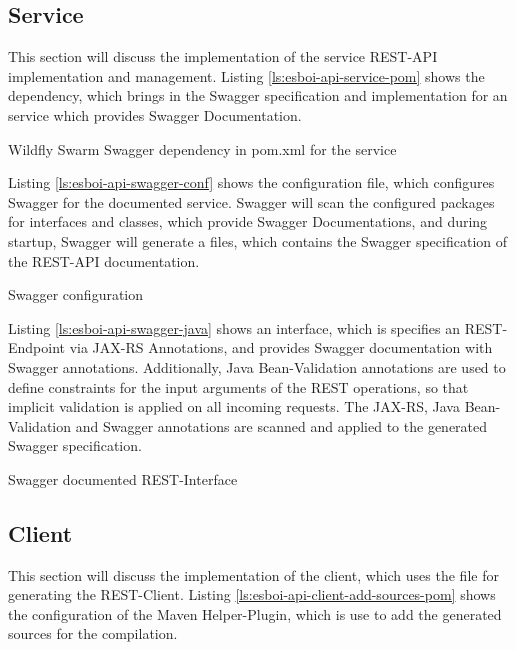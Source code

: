 \subsection{Service}
\label{sec:esbi-api-service}
This section will discuss the implementation of the service REST-API implementation and management. Listing \vref{ls:esboi-api-service-pom} shows the dependency, which brings in the Swagger specification and implementation for an service which provides Swagger Documentation.

\begin{listing}[h]
	\caption{Wildfly Swarm Swagger dependency in pom.xml for the service}
	\label{ls:esboi-api-service-pom}
\end{listing}

Listing \vref{ls:esboi-api-swagger-conf} shows the  configuration file, which configures Swagger for the documented service. Swagger will scan the configured packages for interfaces and classes, which provide Swagger Documentations, and during startup, Swagger will generate a  files, which contains the Swagger specification of the REST-API documentation.   

\begin{listing}[h]
	\caption{Swagger configuration}
	\label{ls:esboi-api-swagger-conf}
\end{listing}

Listing \vref{ls:esboi-api-swagger-java} shows an interface, which is specifies an REST-Endpoint via JAX-RS Annotations, and provides Swagger documentation with Swagger annotations. Additionally, Java Bean-Validation annotations are used to define constraints for the input arguments of the REST operations, so that implicit validation is applied on all incoming requests. The JAX-RS, Java Bean-Validation and Swagger annotations are scanned and applied to the generated Swagger specification.

\begin{listing}[h]
	\caption{Swagger documented REST-Interface}
	\label{ls:esboi-api-swagger-java}
\end{listing} 

\subsection{Client}
\label{sec:esbi-api-client}
This section will discuss the implementation of the client, which uses the  file for generating the REST-Client. Listing \vref{ls:esboi-api-client-add-sources-pom} shows the configuration of the Maven Helper-Plugin, which is use to add the generated sources for the compilation.

